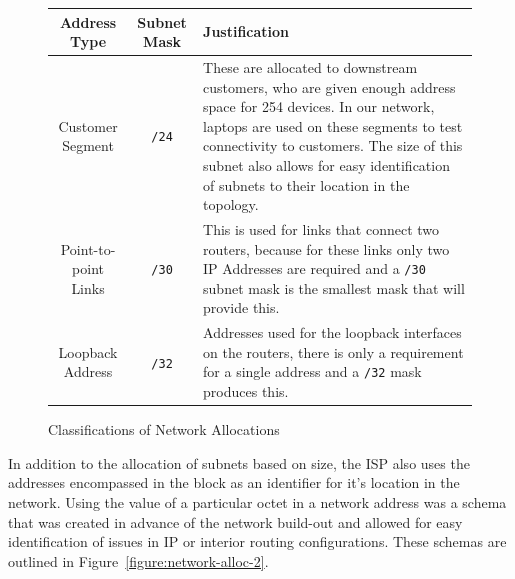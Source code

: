\begin{figure}[!ht]
    \caption{Classifications of Network Allocations}
    \label{figure:network-alloc-1}
    \centering
    \begin{tabular}{|c|c|p{5.5cm}|}

        \hline
        \textbf{Address Type} & \textbf{Subnet Mask} & \textbf{Justification} \\

        \hline
        Customer Segment & \texttt{/24} & These are allocated to
        downstream customers, who are given enough address space for 254
        devices. In our network, laptops are used on these segments to test
        connectivity to customers. The size of this subnet also allows for easy
        identification of subnets to their location in the topology.\\

        \hline
        Point-to-point Links & \texttt{/30} & This is used for links that
        connect two routers, because for these links only two IP Addresses are
        required and a \texttt{/30} subnet mask is the smallest mask that will
        provide this.\\

        \hline
        Loopback Address & \texttt{/32} & Addresses used for the loopback
        interfaces on the routers, there is only a requirement for a single
        address and a \texttt{/32} mask produces this.\\

        \hline
    \end{tabular}
\end{figure}

In addition to the allocation of subnets based on size, the ISP also uses the
addresses encompassed in the block as an identifier for it's location in the
network. Using the value of a particular octet in a network address was a schema
that was created in advance of the network build-out and allowed for easy
identification of issues in IP or interior routing configurations. These schemas
are outlined in Figure~\ref{figure:network-alloc-2}.

